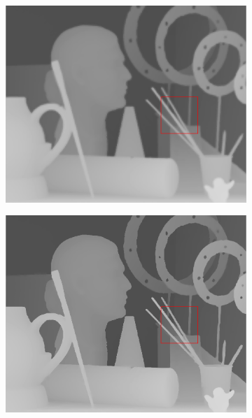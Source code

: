 \documentclass[preprint,10pt,5p,times,twocolumn]{elsarticle}
\begin{document}
\begin{figure}[t]
\begin{center}
\begin{subfigure}[b]{0.136\linewidth}
    \label{fig:} %
\end{subfigure}
\begin{subfigure}[b]{0.136\linewidth}
    \includegraphics[width=\linewidth]{cmp_art_8X_JBL.png}
    \label{fig:}
\end{subfigure}
\begin{subfigure}[b]{0.136\linewidth}
    \includegraphics[width=\linewidth]{cmp_art_8X_AR.png}
    \label{fig:} %
\end{subfigure}
\begin{subfigure}[b]{0.136\linewidth}

\end{subfigure}
\end{center}
\end{figure}
\end{document}
